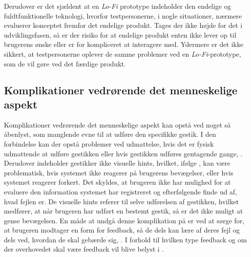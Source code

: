 Derudover er det sjældent at en \textit{Lo-Fi} prototype indeholder den endelige og fuldtfunktionelle teknologi, hvorfor testpersonerne, i nogle situationer, nærmere evaluerer konceptet fremfor det endelige produkt. Tages der ikke højde for det i udviklingsfasen, så er der risiko for at endelige produkt enten ikke lever op til brugerens ønske eller er for kompliceret at interagere med. Ydermere er det ikke sikkert, at testpersonerne oplever de samme problemer ved en \textit{Lo-Fi}-prototype, som de vil gøre ved det færdige produkt.   
%
\subsection{Komplikationer vedrørende det menneskelige aspekt}
\label{KomplikationerVedroerendeDetMenneskelige}
%
Komplikationer vedrørende det menneskelige aspekt kan opstå ved noget så åbenlyst, som manglende evne til at udføre den specifikke gestik. I den forbindelse kan der opstå problemer ved udmattelse, hvis det er fysisk udmattende at udføre gestikken eller hvis gestikken udføres gentagende gange, \parencite[s. 28]{PDF:ATaxonomyOfGestures}. Derudover indeholder gestikker ikke visuelle hints, hvilket, ifølge \textcite[s. 6]{PDF:NaturalUserInterfaces}, kan være problematisk, hvis systemet ikke reagerer på brugerens bevægelser, eller hvis systemet reagerer forkert. Det skyldes, at brugeren ikke har mulighed for at evaluere den information systemet har registreret og efterfølgende finde ud af, hvad fejlen er. De visuelle hints referer til selve udførelsen af gestikken, hvilket medfører, at når brugeren har udført en bestemt gestik, så er det ikke muligt at gense bevægelsen. En måde at undgå denne komplikation på er ved at sørge for, at brugeren modtager en form for feedback, så de dels kan lære af deres fejl og dels ved, hvordan de skal gebærde sig, \parencite[s. 10]{PDF:NaturalUserInterfaces}. I forhold til hvilken type feedback og om der overhovedet skal være feedback vil blive belyst i . \blankline
%
